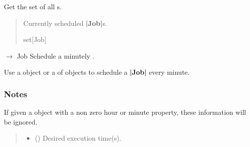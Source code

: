 \documentclass[letterpaper,10pt,english]{sphinxmanual}
\begin{document}
\begin{fulllineitems}

\begin{fulllineitems}
\label{\detokenize{index:scheduler.Scheduler.jobs}}
\pysigstartsignatures
\pysigline
{}
\pysigstopsignatures
\sphinxAtStartPar
Get the set of all s.
\begin{quote}\begin{description}
\sphinxAtStartPar
Currently scheduled {\color{red}\bfseries{}|Job|}s.

\sphinxAtStartPar
set{[}Job{]}

\end{description}\end{quote}

\end{fulllineitems}


\begin{fulllineitems}
\label{\detokenize{index:scheduler.Scheduler.minutely}}
\pysigstartsignatures
\pysiglinewithargsret
{}
{\sphinxparamcomma {}\sphinxparamcomma {}}
{{ $\rightarrow$ Job}}
\pysigstopsignatures
\sphinxAtStartPar
Schedule a minutely .

\sphinxAtStartPar
Use a  object or a  of  objects
to schedule a {\color{red}\bfseries{}|Job|} every minute.
\subsubsection*{Notes}

\sphinxAtStartPar
If given a  object with a non zero hour or minute property, these
information will be ignored.
\begin{quote}\begin{description}
\begin{itemize}
\item {} 
\sphinxAtStartPar
{} () \textendash{} Desired execution time(s).


\end{itemize}
\end{description}
\end{quote}
\end{fulllineitems}
\end{fulllineitems}
\end{document}
